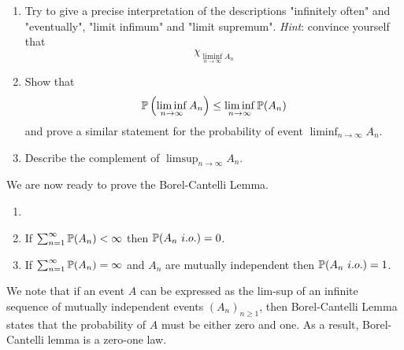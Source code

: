 \begin{exercise}
\begin{enumerate}
\item Try to give a precise interpretation of the descriptions "infinitely often" and "eventually", "limit infimum" and "limit supremum".
\textit{Hint}: convince yourself that
\begin{equation}
\chi_{\liminf_{n\to\infty} A_n}
\end{equation}
\item Show that
\begin{equation}
\mathbb{P}\left( \liminf_{n\to\infty} A_n \right) \leq \liminf_{n\to\infty} \mathbb{P}(A_n)
\end{equation}
and prove a similar statement for the probability of event $\liminf_{n\to\infty} A_n$.
\item Describe the complement of $\limsup_{n\to\infty} A_n$.
\end{enumerate}
\end{exercise}

We are now ready to prove the Borel-Cantelli Lemma. 
\begin{theorem}
\begin{enumerate}
    \item[]
    \item If $\sum_{n=1}^\infty \mathbb{P}(A_n) < \infty$ then $\mathbb{P}(A_n \,\, i.o.) = 0$.
    \item If $\sum_{n=1}^\infty \mathbb{P}(A_n) = \infty$ and $A_n$ are mutually independent then $\mathbb{P}(A_n \,\, i.o.) = 1$.
\end{enumerate}
\end{theorem}

We note that if an event $A$ can be expressed as the lim-sup of an infinite sequence of mutually independent events $(A_n)_{n\geq 1}$, then Borel-Cantelli Lemma states that the probability of $A$ must be either zero and one. As a result, Borel-Cantelli lemma is a zero-one law.


